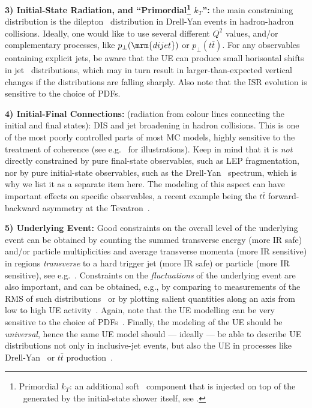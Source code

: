 \textbf{3) Initial-State Radiation, and 
  ``Primordial\footnote{Primordial $k_T$: an
  additional soft \pt\ component that is injected on top of the
  \pt\ generated by the initial-state shower itself, see
  \cite[Section 7.1]{Buckley:2011ms}.} $k_T$'':} the main constraining
  distribution is the dilepton \pt\ distribution in Drell-Yan events in
  hadron-hadron collisions. Ideally, one would like to use 
  several different $Q^2$ values, and/or complementary processes,
  like $p_\perp(\mrm{dijet})$ or $p_\perp(t\bar{t})$. 
For any observables containing explicit
  jets, be aware that the UE can produce small 
  horisontal shifts in jet \pt\ distributions, which may in turn 
  result in larger-than-expected 
  vertical changes if the distributions are falling sharply. Also note
  that the ISR evolution is sensitive to the choice of PDFs.

\textbf{4) Initial-Final Connections:} (radiation from
  colour lines connecting the initial and final states): 
%
DIS and jet broadening in hadron collisions. This is one of the
  most poorly controlled parts of most MC models, highly sensitive to
  the treatment of coherence (see e.g.~\cite{Ritzmann:2012ca} for
  illustrations).  
  Keep in mind that it
  is \emph{not} directly constrained by pure final-state observables,
  such as LEP fragmentation, nor by pure initial-state observables,
  such as the Drell-Yan \pt\ spectrum, which is why we list it as a
  separate item here. The modeling of this
  aspect can have important effects on specific observables, a recent
  example being the $t\bar{t}$ forward-backward asymmetry at the
  Tevatron~\cite{Skands:2012mm}.

\textbf{5) Underlying Event:} Good constraints on the overall level of the
  underlying event can be obtained by counting the summed transverse
  energy (more IR safe) and/or particle multiplicities and average
  transverse momenta (more IR sensitive) in regions \emph{transverse}
  to a hard trigger jet (more IR safe) or particle (more IR
  sensitive), see e.g.~\cite{Field:2011iq}. 
  Constraints on the \emph{fluctuations} of the underlying
  event are also important, and can be obtained, e.g., by comparing to
  measurements of the RMS of such distributions~\cite{Aad:2010fh} or
  by plotting salient quantities along an axis from low to high UE
  activity~\cite{Martin:2016igp}. Again, note
  that the UE modelling can be very sensitive to the choice of
  PDFs~\cite{Schulz:2011qy,Skands:2014pea}. Finally, the modeling of
  the UE should be \emph{universal}, hence the same UE model should
  --- ideally --- be able to describe UE distributions not only in
  inclusive-jet events, but also the UE in processes like
  Drell-Yan~\cite{Aaltonen:2010rm,Chatrchyan:2012tb,Aad:2014jgf,Alioli:2016wqt}
  or  $t\bar{t}$ production~\cite{CMS:2013mfa,CMS:2015usp}.  

